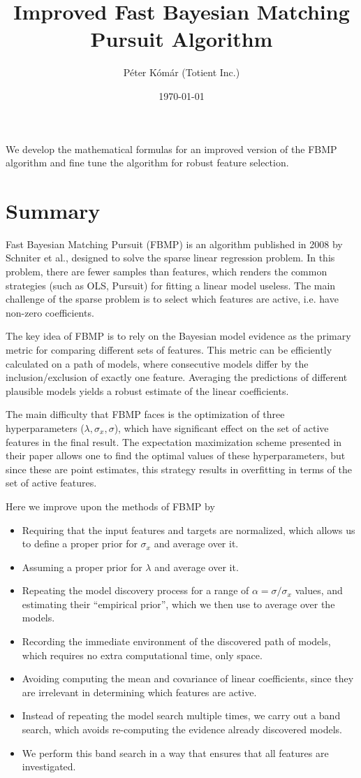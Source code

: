 \documentclass[letter,10pt,oneside]{article}
\author{P\'{e}ter K\'{o}m\'{a}r (Totient Inc.)}
\title{Improved Fast Bayesian Matching Pursuit Algorithm}
\date{\today}
\newcommand{\no}{\noindent}
\newcommand{\+}{^\dagger}
\begin{document}
\thispagestyle{empty}
\maketitle

\no {\bf One sentence summary: } We develop the mathematical formulas for an improved version of the FBMP algorithm and fine tune the algorithm for robust feature selection.

\section*{Summary}
Fast Bayesian Matching Pursuit (FBMP) is an algorithm published in 2008 by Schniter et al., designed to solve the sparse linear regression problem. In this problem, there are fewer samples than features, which renders the common strategies (such as OLS, Pursuit) for fitting a linear model useless. The main challenge of the sparse problem is to select which features are active, i.e. have non-zero coefficients.

The key idea of FBMP is to rely on the Bayesian model evidence as the primary metric for comparing  different sets of features. This metric can be efficiently calculated on a path of models, where consecutive models differ by the inclusion/exclusion of exactly one feature. Averaging the predictions of different plausible models yields a robust estimate of the linear coefficients.

The main difficulty that FBMP faces is the optimization of three hyperparameters ($\lambda, \sigma_x, \sigma$), which have significant effect on the set of active features in the final result. The expectation maximization scheme presented in their paper allows one to find the optimal values of these hyperparameters, but since these are point estimates, this strategy results in overfitting in terms of the set of active features.

Here we improve upon the methods of FBMP by
\begin{itemize}
  \item Requiring that the input features and targets are normalized, which allows us to define a proper prior for $\sigma_x$ and average over it.
  \item Assuming a proper prior for $\lambda$ and average over it.
  \item Repeating the model discovery process for a range of $\alpha = \sigma / \sigma_x$ values, and estimating their ``empirical prior'', which we then use to average over the models.
  \item Recording the immediate environment of the discovered path of models, which requires no extra computational time, only space.
  \item Avoiding computing the mean and covariance of linear coefficients, since they are irrelevant in determining which features are active.
  \item Instead of repeating the model search multiple times, we carry out a band search, which avoids re-computing the evidence already discovered models.
  \item We perform this band search in a way that ensures that all features are investigated.
\end{itemize}
\end{document}
